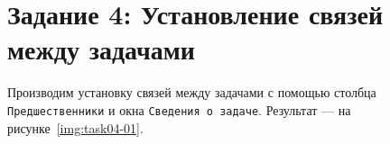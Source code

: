 \section{Задание 4: Установление связей между задачами}

Производим установку связей между задачами с помощью столбца
\texttt{Предшественники} и окна \texttt{Сведения о задаче}.
Результат --- на рисунке~\ref{img:task04-01}.

